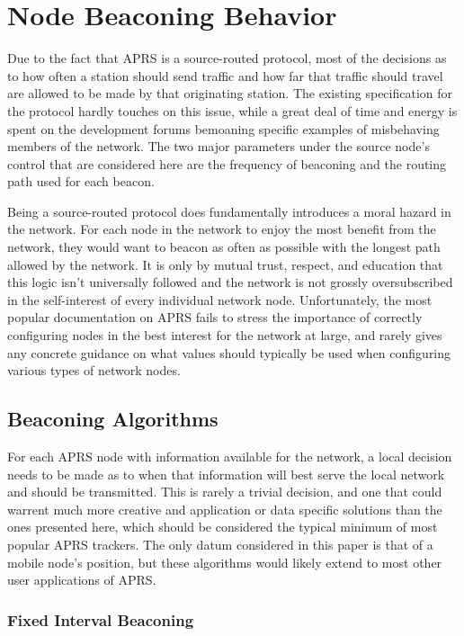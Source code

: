 \chapter{Node Beaconing Behavior}

Due to the fact that APRS is a source-routed protocol, most of the decisions as
to how often a station should send traffic and how far that traffic should
travel are allowed to be made by that originating station. 
The existing specification for the protocol hardly touches on this issue, 
while a great deal of time and energy is spent on the development forums 
bemoaning specific examples of misbehaving members of the network.
The two major parameters under the source node's control that are considered
here are the frequency of beaconing and the routing path used for each beacon.

Being a source-routed protocol does fundamentally introduces a
moral hazard in the network. For each node in the network to enjoy the
most benefit from the network, they would want to beacon as often as possible 
with the longest path allowed by the network.
It is only by mutual trust, respect, and education that this 
logic isn't universally followed and the network is not grossly oversubscribed
in the self-interest of every individual network node. 
Unfortunately, the most popular documentation on APRS fails to stress the 
importance of correctly configuring nodes in the best interest for the network
at large, and rarely gives any concrete guidance on what values should typically
be used when configuring various types of network nodes.


\section{Beaconing Algorithms}

For each APRS node with information available for the network,
a local decision needs to be made as to when that information will best 
serve the local network and should be transmitted. This is rarely a trivial 
decision, and one that could warrent much more creative and application or data
specific solutions than the ones presented here, which should be considered 
the typical minimum of most popular APRS trackers. The only datum considered 
in this paper is that of a mobile node's position, but these algorithms would
likely extend to most other user applications of APRS.

\subsection{Fixed Interval Beaconing}

